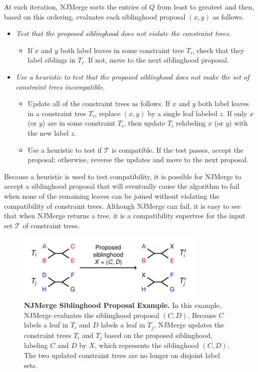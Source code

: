 At each iteration, NJMerge sorts the entries of $Q$ from least to greatest and then, based on this ordering, evaluates each siblinghood proposal $(x,y)$ as follows.
\begin{itemize} %
	\item {\em Test that the proposed siblinghood does not violate the constraint trees.} 
	\begin{itemize}
		\item If $x$ and $y$ both label leaves in some constraint tree $T_i$, check that they label siblings in $T_i$. If not, move to the next siblinghood proposal.
	\end{itemize} 
	\item {\em Use a heuristic to test that the proposed siblinghood does not make the set of constraint trees incompatible.} 
	\begin{itemize}
		\item Update all of the constraint trees as follows. 
		If $x$ and $y$ both label leaves in a constraint tree $T_i$, replace $(x,y)$ by a single leaf labeled $z$.
	If only $x$ (or $y$) are in some constraint $T_i$, then update $T_i$ relabeling $x$ (or $y$) with the new label $z$. 
	\item Use a heuristic to test if $\mathcal{T}$ is compatible. If the test passes, accept the proposal; otherwise, reverse the updates and move to the next proposal.
	\end{itemize}
\end{itemize}
Because a heuristic is used to test compatibility, it is possible for NJMerge to accept a siblinghood proposal that will eventually cause the algorithm to fail when none of the remaining leaves can be joined without violating the compatibility of constraint trees.
Although NJMerge can fail, it is easy to see that when NJMerge returns a tree, it is a compatibility supertree for the input set $\mathcal{T}$ of constraint trees.

\begin{figure}[!h]
\centering
\includegraphics[width=0.8\textwidth]{figures/njmerge-fig3.pdf}
\caption{
{\bf NJMerge Siblinghood Proposal Example. }
In this example, NJMerge evaluates the siblinghood proposal $(C,D)$.
Because $C$ labels a leaf in $T_i$ and $D$ labels a leaf in $T_j$, NJMerge updates the constraint trees $T_i$ and $T_j$ based on the proposed siblinghood, labeling $C$ and $D$ by $X$, which represents the siblinghood $(C,D)$. 
The two updated constraint trees are no longer on disjoint label sets.
}
\label{fig:njmerge-join}
\end{figure}

